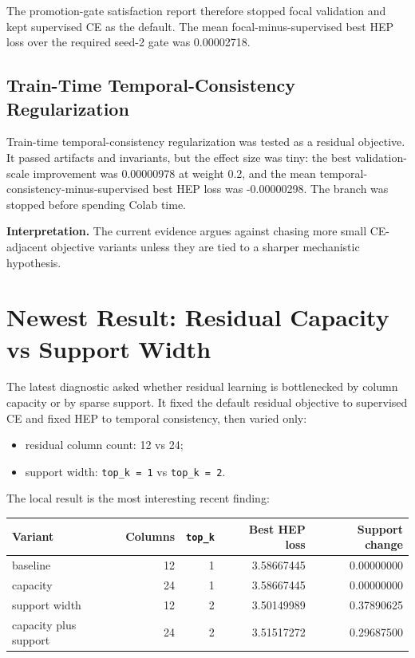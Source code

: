 \documentclass[11pt]{article}
\begin{document}
The promotion-gate satisfaction report therefore stopped focal validation and
kept supervised CE as the default. The mean focal-minus-supervised best HEP
loss over the required seed-2 gate was 0.00002718.

\subsection{Train-Time Temporal-Consistency Regularization}

Train-time temporal-consistency regularization was tested as a residual
objective. It passed artifacts and invariants, but the effect size was tiny:
the best validation-scale improvement was 0.00000978 at weight 0.2, and the
mean temporal-consistency-minus-supervised best HEP loss was -0.00000298.
The branch was stopped before spending Colab time.

\textbf{Interpretation.} The current evidence argues against chasing more
small CE-adjacent objective variants unless they are tied to a sharper
mechanistic hypothesis.

\section{Newest Result: Residual Capacity vs Support Width}

The latest diagnostic asked whether residual learning is bottlenecked by
column capacity or by sparse support. It fixed the default residual objective
to supervised CE and fixed HEP to temporal consistency, then varied only:

\begin{itemize}
  \item residual column count: 12 vs 24;
  \item support width: \texttt{top\_k = 1} vs \texttt{top\_k = 2}.
\end{itemize}

The local result is the most interesting recent finding:

\begin{center}
\begin{tabular}{l r r r r}
\hline
Variant & Columns & \texttt{top\_k} & Best HEP loss & Support change \\
\hline
baseline & 12 & 1 & 3.58667445 & 0.00000000 \\
capacity & 24 & 1 & 3.58667445 & 0.00000000 \\
support width & 12 & 2 & 3.50149989 & 0.37890625 \\
capacity plus support & 24 & 2 & 3.51517272 & 0.29687500 \\
\hline
\end{tabular}
\end{center}
\end{document}
